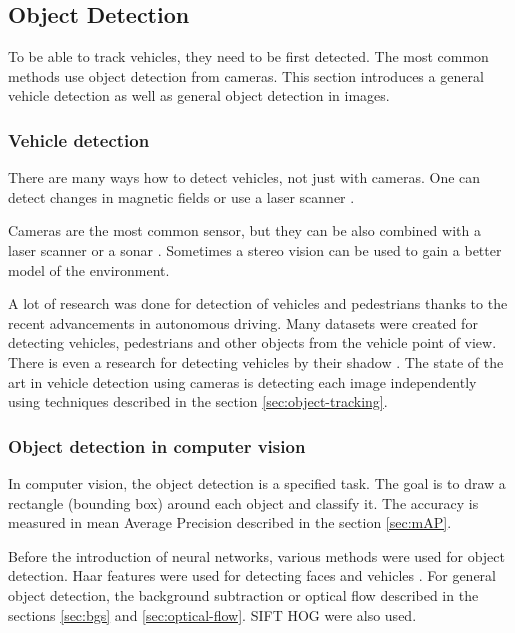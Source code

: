 \documentclass[a4paper,11pt,titlepage,twoside]{article}
\numberwithin{figure}{section}
\begin{document}
\subsection{Object Detection}
To be able to track vehicles, they need to be first detected. The most common methods use object detection from cameras. This section introduces a general vehicle detection as well as general object detection in images.

\label{sec:detection}
\subsubsection{Vehicle detection}
There are many ways how to detect vehicles, not just with cameras. One can detect changes in magnetic fields \cite{daubaras2012vehicle, caruso1999vehicle} or use a laser scanner \cite{gate2009fast}.

Cameras are the most common sensor, but they can be also combined with a laser scanner \cite{wender20083d, premebida2007lidar} or a sonar \cite{kim2005front, wang2003online}. Sometimes a stereo vision \cite{bertozzi2000stereo, toulminet2006vehicle} can be used to gain a better model of the environment.

A lot of research was done for detection of vehicles and pedestrians thanks to the recent advancements in autonomous driving. Many datasets were created \cite{huang2018apolloscape, madhavan2017bdd, RobotCarDatasetIJRR, ncarlevaris-2015a} for detecting vehicles, pedestrians and other objects from the vehicle point of view. There is even a research for detecting vehicles by their shadow \cite{tzomakas1998vehicle}. The state of the art in vehicle detection using cameras is detecting each image independently using techniques described in the section \ref{sec:object-tracking}.


\subsubsection{Object detection in computer vision}
\label{sec:object_detection}
In computer vision, the object detection is a specified task. The goal is to draw a rectangle (bounding box) around each object and classify it. The accuracy is measured in mean Average Precision described in the section \ref{sec:mAP}. 

Before the introduction of neural networks, various methods were used for object detection. Haar features were used for detecting faces \cite{haar, lienhart2002extended, viola2004robust} and vehicles \cite{sun2002real}. For general object detection, the background subtraction \cite{piccardi2004background, horprasert1999statistical} or optical flow \cite{naoya1990optical, quenot1992orthogonal, chen2011tracking} described in the sections \ref{sec:bgs} and \ref{sec:optical-flow}. SIFT \cite{lowe2004distinctive} HOG \cite{girshick2014rich, wang2009hog, zhu2006fast, felzenszwalb2010object, dalal2005histograms} were also used.
\end{document}
